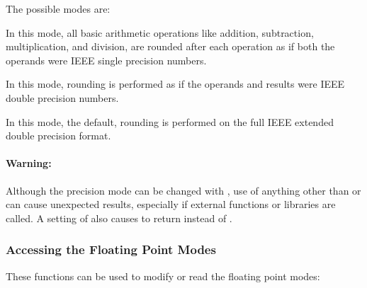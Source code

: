 The possible modes are:
\begin{Lentry}
  
\item[\kwd{24-bit}] In this mode, all basic arithmetic operations like
  addition, subtraction, multiplication, and division, are rounded
  after each operation as if both the operands were IEEE single
  precision numbers.  
  
\item[\kwd{53-bit}] In this mode, rounding is performed as if the
  operands and results were IEEE double precision numbers.
  
\item[\kwd{64-bit}] In this mode, the default, rounding is performed
  on the full IEEE extended double precision format.
  
\end{Lentry}

\paragraph{Warning:}

Although the precision mode can be changed with
, use of anything other than
 or  can cause unexpected results, especially
if external functions or libraries are called.  A setting of
 also causes 
to return \true instead of \false.


\subsubsection{Accessing the Floating Point Modes}

These functions can be used to modify or read the floating point modes:


